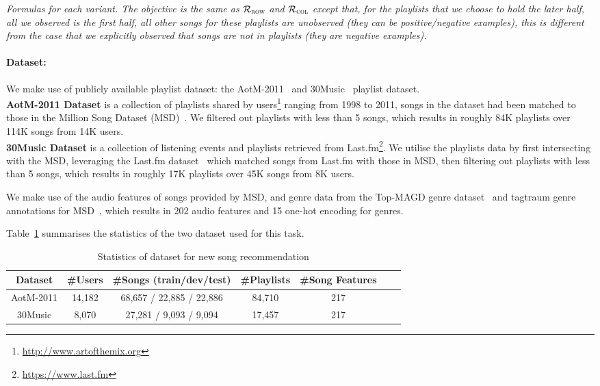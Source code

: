 \TODO
{\it Formulas for each variant.
The objective is the same as $\mathcal{R}_\textsc{row}$ and $\mathcal{R}_\textsc{col}$ except that,
for the playlists that we choose to hold the later half, all we observed is the first half, 
all other songs for these playlists are unobserved (they can be positive/negative examples),
this is different from the case that we explicitly observed that songs are not in playlists (they are negative examples).
}




\paragraph{Dataset:}
We make use of publicly available playlist dataset: the AotM-2011~\cite{mcfee2012hypergraph} and 30Music~\cite{30music2015} playlist dataset. \\
%
{\bf AotM-2011 Dataset} is a collection of playlists shared by users\footnote{\url{http://www.artofthemix.org}} ranging from 1998 to 2011, 
songs in the dataset had been matched to those in the Million Song Dataset (MSD)~\cite{msd2011}.
We filtered out playlists with less than 5 songs, which results in roughly 84K playlists over 114K songs from 14K users. \\
%
{\bf 30Music Dataset} is a collection of listening events and playlists retrieved from Last.fm\footnote{\url{https://www.last.fm}}.
We utilise the playlists data by first intersecting with the MSD, leveraging the Last.fm dataset~\cite{lastfmdataset} 
which matched songs from Last.fm with those in MSD, then filtering out playlists with less than 5 songs, 
which results in roughly 17K playlists over 45K songs from 8K users.

We make use of the audio features of songs provided by MSD, 
and genre data from the Top-MAGD genre dataset~\cite{schindler2012facilitating} and tagtraum genre annotations for MSD~\cite{schreiber2015improving},
which results in 202 audio features and 15 one-hot encoding for genres.


Table~\ref{tab:stats_newsongrec} summarises the statistics of the two dataset used for this task.

\begin{table}[!h]
\centering
\caption{Statistics of dataset for new song recommendation}
\label{tab:stats_newsongrec}
\begin{tabular}{ccccccc}
\toprule
Dataset & \#Users & \#Songs (train/dev/test) & \#Playlists & \#Song Features \\
\midrule
AotM-2011 & 14,182  & 68,657 / 22,885 / 22,886 & 84,710 & 217 \\
30Music   & 8,070   & 27,281 / 9,093 / 9,094   & 17,457 & 217 \\
\bottomrule
\end{tabular}
\end{table}


